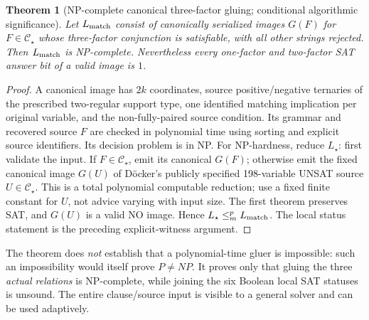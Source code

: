 \documentclass[11pt]{article}
\newtheorem{theorem}{Theorem}
\newcommand{\CS}{\mathcal C_{\star}}
\begin{document}
\begin{theorem}[NP-complete canonical three-factor gluing; conditional algorithmic significance]
Let $L_{\rm match}$ consist of canonically serialized images $G(F)$ for $F\in\CS$ whose three-factor conjunction is satisfiable, with all other strings rejected. Then $L_{\rm match}$ is NP-complete. Nevertheless every one-factor and two-factor SAT answer bit of a valid image is $1$.
\end{theorem}
\begin{proof}
A canonical image has $2k$ coordinates, source positive/negative ternaries of the prescribed two-regular support type, one identified matching implication per original variable, and the non-fully-paired source condition. Its grammar and recovered source $F$ are checked in polynomial time using sorting and explicit source identifiers. Its decision problem is in NP. For NP-hardness, reduce $L_\star$: first validate the input. If $F\in\CS$, emit its canonical $G(F)$; otherwise emit the fixed canonical image $G(U)$ of D\"ocker's publicly specified 198-variable UNSAT source $U\in\CS$. This is a total polynomial computable reduction; use a fixed finite constant for $U$, not advice varying with input size. The first theorem preserves SAT, and $G(U)$ is a valid NO image. Hence $L_\star\le_m^p L_{\rm match}$. The local status statement is the preceding explicit-witness argument.
\end{proof}
\noindent
The theorem does \emph{not} establish that a polynomial-time gluer is impossible: such an impossibility would itself prove $P\ne NP$. It proves only that gluing the three \emph{actual relations} is NP-complete, while joining the six Boolean local SAT statuses is unsound. The entire clause/source input is visible to a general solver and can be used adaptively.
\end{document}
